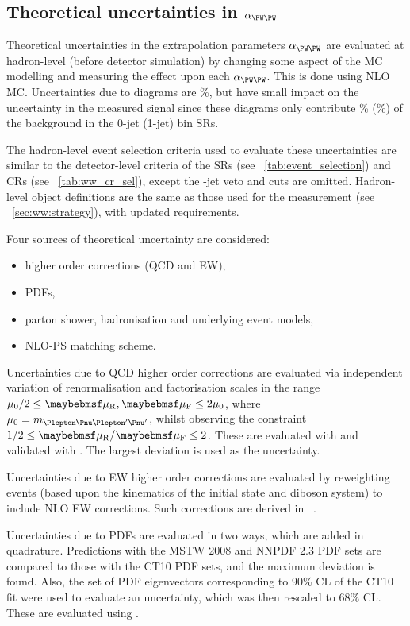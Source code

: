 \subsection{Theoretical uncertainties in $\alpha_{\WW}$}
\label{sec:ww_bkg:alpha}

Theoretical uncertainties in the extrapolation parameters $\alpha_{\WW}$ are evaluated 
at hadron-level (\ie before detector simulation) by changing some aspect of the MC 
modelling and measuring the effect upon each $\alpha_{\WW}$. This is done using NLO \WW 
MC. Uncertainties due to \ggWW diagrams are \%, but have small impact on the 
uncertainty in the measured signal since these diagrams only contribute \% 
(\%) of the \WW background in the 0-jet (1-jet) bin SRs.

The hadron-level event selection criteria used to evaluate these uncertainties are similar 
to the detector-level criteria of the SRs (see \Table~\ref{tab:event_selection}) and CRs 
(see \Table~\ref{tab:ww_cr_sel}), except the \Pbottom-jet veto and \frecoil cuts are omitted.
Hadron-level object definitions are the same as those used for the \WW measurement (see 
\Section~\ref{sec:ww:strategy}), with updated \pt requirements.

Four sources of theoretical uncertainty are considered:
\begin{itemize}[noitemsep,nolistsep]
	\item higher order corrections (QCD and EW),
	\item PDFs,
	\item parton shower, hadronisation and underlying event models,
	\item NLO-PS matching scheme.
\end{itemize}

Uncertainties due to QCD higher order corrections are evaluated via independent variation of 
renormalisation and factorisation scales in the range $\mu_0/2 \leq \mur,\muf 
\leq 2\mu_0$, where $\mu_0 = m_{\HepProcess{\Plepton\Pnu\Plepton'\Pnu'}}$, whilst observing 
the constraint $1/2 \leq \mur/\muf \leq 2$. These are evaluated with \amcatnlo and validated 
with \mcfm. The largest deviation is used as the uncertainty.

Uncertainties due to EW higher order corrections are evaluated by reweighting \powhegbox 
events (based upon the kinematics of the initial state and diboson system) to include NLO EW 
corrections. Such corrections are derived in \Reference~\cite{WW:NLO-EW}.

Uncertainties due to PDFs are evaluated in two ways, which are added in quadrature. 
Predictions with the MSTW 2008 \cite{MSTW} and NNPDF 2.3 \cite{NNPDF} PDF sets are compared 
to those with the CT10 \cite{CTEQ} PDF sets, and the maximum deviation is found. Also, the 
set of PDF eigenvectors corresponding to 90\% CL of the CT10 fit were used to evaluate an 
uncertainty, which was then rescaled to 68\% CL. These are evaluated using \amcatnlo.

